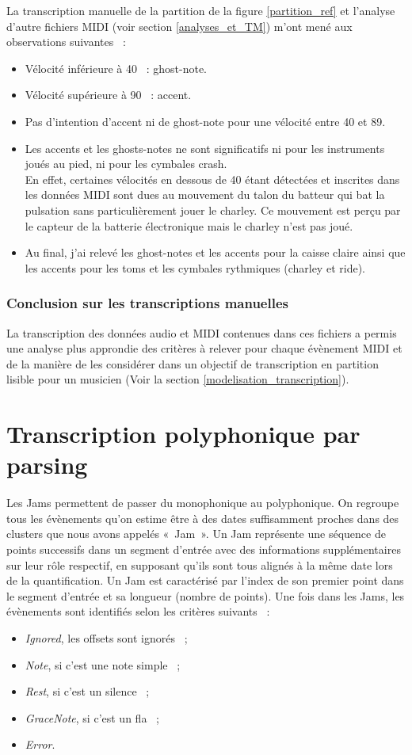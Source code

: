La transcription manuelle de la partition de la figure \ref{partition_ref} et
l’analyse d’autre fichiers MIDI (voir section \ref{analyses_et_TM}) m’ont mené
aux observations suivantes~ :
\begin{itemize}
	\item Vélocité inférieure à 40~ : ghost-note.
	\item Vélocité supérieure à 90~ : accent.
	\item Pas d’intention d’accent ni de ghost-note pour une vélocité entre 40
        et 89.
	\item Les accents et les ghosts-notes ne sont significatifs ni pour les
        instruments joués au pied, ni pour les cymbales crash.\\
	En effet, certaines vélocités en dessous de 40 étant détectées et inscrites
    dans les données MIDI sont dues au mouvement du talon du batteur qui bat la
    pulsation sans particulièrement jouer le charley. Ce mouvement est perçu
    par le capteur de la batterie électronique mais le charley n’est pas joué.
	\item Au final, j’ai relevé les ghost-notes et les accents pour la caisse
        claire ainsi que les accents pour les toms et les cymbales rythmiques
        (charley et ride).
\end{itemize}


\subsubsection{Conclusion sur les transcriptions manuelles}
La transcription des données audio et MIDI contenues dans ces fichiers a permis
une analyse plus approndie des critères à relever pour chaque évènement MIDI et
de la manière de les considérer dans un objectif de transcription en partition
lisible pour un musicien (Voir la section \ref{modelisation_transcription}).


\section{Transcription polyphonique par parsing}
\label{jam}
Les Jams permettent de passer du monophonique au polyphonique.
On regroupe tous les évènements qu’on estime être à des dates suffisamment
proches dans des clusters que nous avons appelés «~Jam~».
Un Jam représente une séquence de points successifs dans un segment d’entrée
avec des informations supplémentaires sur leur rôle respectif, en supposant
qu’ils sont tous alignés à la même date lors de la quantification. Un Jam est
caractérisé par l’index de son premier point dans le segment d’entrée et sa
longueur (nombre de points).
Une fois dans les Jams, les évènements sont identifiés selon les critères
suivants~ :
\begin{itemize}
    \item \textit{Ignored}, les offsets sont ignorés~ ;
    \item \textit{Note}, si c’est une note simple~ ;
    \item \textit{Rest}, si c’est un silence~ ;
    \item \textit{GraceNote}, si c’est un fla~ ;
    \item \textit{Error}.
\end{itemize}

